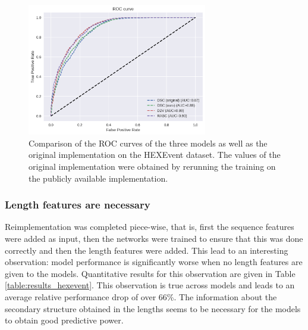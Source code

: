 \begin{figure}
	\centering\includegraphics[width=0.7\textwidth]{../visualizations/ch5-results/hexevent_cross_model_roc_auc_comparison.png} 
	\caption{Comparison of the ROC curves of the three models as well as the original implementation on the HEXEvent dataset. The values of the original implementation were obtained by rerunning the training on the publicly available implementation. }
	\label{fig:hexevent_auc}
\end{figure}






\subsubsection{Length features are necessary}
Reimplementation was completed piece-wise, that is, first the sequence features were added as input, then the networks were trained to ensure that this was done correctly and then the length features were added. This lead to an interesting observation: model performance is significantly worse when no length features are given to the models. Quantitative results for this observation are given in Table \ref{table:results_hexevent}. This observation is true across models and leads to an average relative performance drop of over 66\%. The information about the secondary structure obtained in the lengths seems to be necessary for the models to obtain good predictive power.

